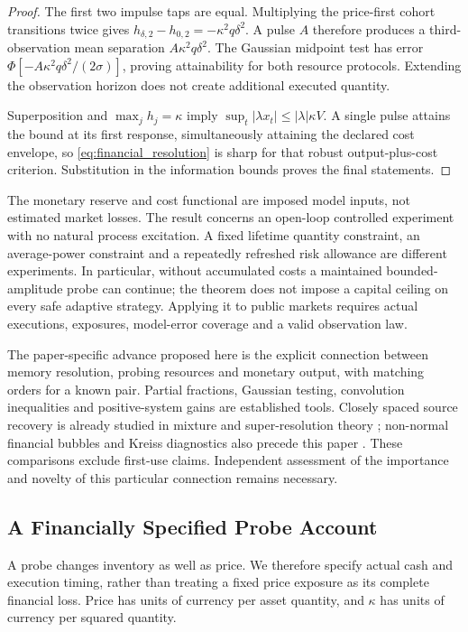 \documentclass[11pt]{article}
\begin{document}
\begin{proof}
The first two impulse taps are equal. Multiplying the price-first cohort transitions twice gives
$h_{\delta,2}-h_{0,2}=-\kappa^2q\delta^2$. A pulse $A$ therefore produces a third-observation mean separation $A\kappa^2q\delta^2$. The Gaussian midpoint test has error $\Phi[-A\kappa^2q\delta^2/(2\sigma)]$, proving attainability for both resource protocols. Extending the observation horizon does not create additional executed quantity.

Superposition and $\max_jh_j=\kappa$ imply $\sup_t|\lambda x_t|\le|\lambda|\kappa V$. A single pulse attains the bound at its first response, simultaneously attaining the declared cost envelope, so \eqref{eq:financial_resolution} is sharp for that robust output-plus-cost criterion. Substitution in the information bounds proves the final statements.
\end{proof}

The monetary reserve and cost functional are imposed model inputs, not estimated market losses. The result concerns an open-loop controlled experiment with no natural process excitation. A fixed lifetime quantity constraint, an average-power constraint and a repeatedly refreshed risk allowance are different experiments. In particular, without accumulated costs a maintained bounded-amplitude probe can continue; the theorem does not impose a capital ceiling on every safe adaptive strategy. Applying it to public markets requires actual executions, exposures, model-error coverage and a valid observation law.

The paper-specific advance proposed here is the explicit connection between memory resolution, probing resources and monetary output, with matching orders for a known pair. Partial fractions, Gaussian testing, convolution inequalities and positive-system gains are established tools. Closely spaced source recovery is already studied in mixture and super-resolution theory \citep{manoleho2022,liuammari2023}; non-normal financial bubbles and Kreiss diagnostics also precede this paper \citep{sornette2023nonnormal}. These comparisons exclude first-use claims. Independent assessment of the importance and novelty of this particular connection remains necessary.


\subsection{A Financially Specified Probe Account}
\label{sec:capital_frontier}
A probe changes inventory as well as price. We therefore specify actual cash and execution timing, rather than treating a fixed price exposure as its complete financial loss. Price has units of currency per asset quantity, and $\kappa$ has units of currency per squared quantity.
\end{document}
